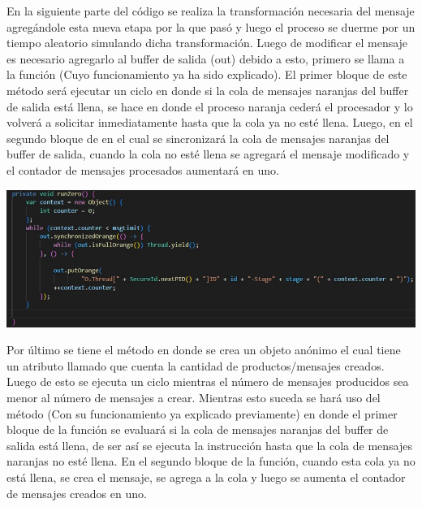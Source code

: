 \documentclass[a4paper]{article}
\begin{document}
    En la siguiente parte del c\'odigo se realiza la transformaci\'on necesaria del mensaje agreg\'andole esta nueva etapa por la que pas\'o y luego el proceso se duerme por un tiempo aleatorio simulando dicha transformaci\'on.
    Luego de modificar el mensaje es necesario agregarlo al buffer de salida (out) debido a esto, primero se llama a la funci\'on  (Cuyo funcionamiento ya ha sido explicado).
    El primer bloque de este m\'etodo ser\'a ejecutar un ciclo en donde si la cola de mensajes naranjas del buffer de salida est\'a llena, se hace  en donde el proceso naranja ceder\'a el procesador y lo volver\'a a solicitar inmediatamente hasta que la cola ya no est\'e llena.
    Luego, en el segundo bloque de en el cual se sincronizar\'a la cola de mensajes naranjas del buffer de salida, cuando la cola no est\'e llena se agregar\'a el mensaje modificado y el contador de mensajes procesados aumentar\'a en uno.\\


    \begin{center}
        \includegraphics[scale=0.5]{N2.jpeg}    
    \end{center}
    Por \'ultimo se tiene el m\'etodo  en donde se crea un objeto an\'onimo  el cual tiene un atributo llamado  que cuenta la cantidad de productos/mensajes creados.
    Luego de esto se ejecuta un ciclo mientras el n\'umero de mensajes producidos sea menor al n\'umero de mensajes a crear.
    Mientras esto suceda se har\'a uso del m\'etodo  (Con su funcionamiento ya explicado previamente) en donde el primer bloque de la funci\'on se evaluar\'a si la cola de mensajes naranjas del buffer de salida est\'a llena, de ser as\'i se ejecuta la instrucci\'on  hasta que la cola de mensajes naranjas no est\'e llena.
    En el segundo bloque de la funci\'on, cuando esta cola ya no est\'a llena, se crea el mensaje, se agrega a la cola y luego se aumenta el contador de mensajes creados en uno.
\end{document}
